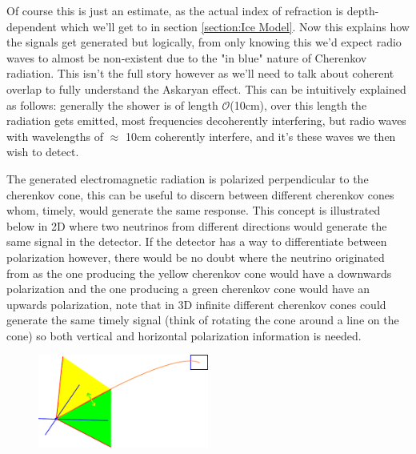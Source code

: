 \documentclass[11pt,a4paper,faculty=we,language=en,doctype=report]{cls/ugent-doc}
\begin{document}
Of course this is just an estimate, as the actual index of refraction is depth-dependent which
we'll get to in section \ref{section:Ice Model}.
Now this explains how the signals get generated but logically, from only knowing this
we'd expect radio waves to almost be non-existent 
due to the "in blue" nature of Cherenkov radiation. 
This isn't the full story however as we'll need to talk about coherent overlap
to fully understand the Askaryan effect. This can be intuitively explained as
follows: generally the shower is of length
$\mathcal{O}$(10cm)\cite{Huege_2017}, over this length the radiation gets
emitted, most frequencies decoherently interfering, but radio waves with wavelengths of 
$\approx$ 10cm coherently interfere, and it's these waves we then wish to detect.


The generated electromagnetic radiation is polarized perpendicular to the
cherenkov cone, this can be useful to discern between different cherenkov cones whom,
timely, would generate the same response. This concept is illustrated below in 2D where
two neutrinos from different directions would generate the same signal in the detector.
If the detector has a way to differentiate between polarization however, there would be no
doubt where the neutrino originated from as the one producing the yellow cherenkov cone
would have a downwards polarization and the one producing a green cherenkov cone would have
an upwards polarization, note that in 3D infinite different cherenkov cones could generate
the same timely signal (think of rotating the cone around a line on the cone) so both vertical
and horizontal polarization information is needed.

\begin{figure}[h!]
	\centering
	\includegraphics[width=0.5\textwidth]{illu_polarization.pdf}
\end{figure}
\end{document}
